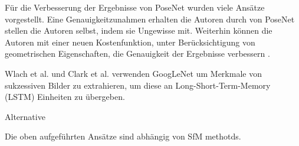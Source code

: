 Für die Verbesserung der Ergebnisse von PoseNet wurden viele Ansätze vorgestellt. Eine Genauigkeitzunahmen erhalten die Autoren durch von PoseNet stellen die Autoren selbst, indem sie Ungewisse mit. Weiterhin können die Autoren mit einer neuen Kostenfunktion, unter Berücksichtigung von geometrischen Eigenschaften, die Genauigkeit der Ergebnisse verbessern \cite{kendallGeometricLossFunctions2017}.

Wlach et al. \cite{walchImagebasedLocalizationUsing2016} und Clark et al. \cite{clarkVidLocDeepSpatioTemporal2017} verwenden GoogLeNet um Merkmale von sukzessiven Bilder zu extrahieren, um diese an Long-Short-Term-Memory (LSTM) \cite{hochreiterLongShortTermMemory1997a} Einheiten zu übergeben.


Alternative 

Die oben aufgeführten Ansätze sind abhängig von SfM methotds.



% 
